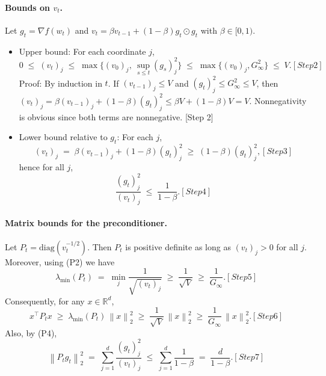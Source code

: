 \documentclass[11pt]{article}
\newcommand{\RR}{\mathbb{R}}
\newcommand{\diag}{\mathrm{diag}}
\newcommand{\norm}[1]{\left\lVert #1 \right\rVert}
\begin{document}
\paragraph{Bounds on $v_t$.}
Let $g_t=\nabla f(w_t)$ and $v_t=\beta v_{t-1} + (1-\beta) g_t\odot g_t$ with $\beta\in[0,1)$.
\begin{itemize}
\item Upper bound: For each coordinate $j$,
\begin{equation}
0\;\le\; (v_t)_j \;\le\; \max\Big\{(v_0)_j,\ \sup_{s\le t}(g_s)_j^2\Big\}
\;\le\; \max\{(v_0)_j, G_\infty^2\}\;\le\; V.
\tag{P2}[Step 2]
\end{equation}
Proof: By induction in $t$. If $(v_{t-1})_j\le V$ and $(g_t)_j^2\le G_\infty^2\le V$, then $(v_t)_j=\beta (v_{t-1})_j + (1-\beta)(g_t)_j^2\le \beta V + (1-\beta) V = V$. Nonnegativity is obvious since both terms are nonnegative. [Step 2]
\item Lower bound relative to $g_t$: For each $j$,
\begin{equation}
(v_t)_j \;=\; \beta (v_{t-1})_j + (1-\beta) (g_t)_j^2 \;\ge\; (1-\beta) (g_t)_j^2,
\tag{P3}[Step 3]
\end{equation}
hence for all $j$,
\begin{equation}
\frac{(g_t)_j^2}{(v_t)_j} \;\le\; \frac{1}{1-\beta}.
\tag{P4}[Step 4]
\end{equation}
\end{itemize}

\paragraph{Matrix bounds for the preconditioner.}
Let $P_t=\diag(v_t^{-1/2})$. Then $P_t$ is positive definite as long as $(v_t)_j>0$ for all $j$. Moreover, using (P2) we have
\begin{equation}
\lambda_{\min}(P_t) \;=\; \min_j \frac{1}{\sqrt{(v_t)_j}} \;\ge\; \frac{1}{\sqrt{V}} \;\ge\; \frac{1}{G_\infty}.
\tag{P5}[Step 5]
\end{equation}
Consequently, for any $x\in\RR^d$,
\begin{equation}
x^\top P_t x \;\ge\; \lambda_{\min}(P_t)\,\norm{x}_2^2 \;\ge\; \frac{1}{\sqrt{V}}\,\norm{x}_2^2 \;\ge\; \frac{1}{G_\infty}\,\norm{x}_2^2.
\tag{P6}[Step 6]
\end{equation}
Also, by (P4),
\begin{equation}
\norm{P_t g_t}_2^2 \;=\; \sum_{j=1}^d \frac{(g_t)_j^2}{(v_t)_j} \;\le\; \sum_{j=1}^d \frac{1}{1-\beta} \;=\; \frac{d}{1-\beta}.
\tag{P7}[Step 7]
\end{equation}
\end{document}
